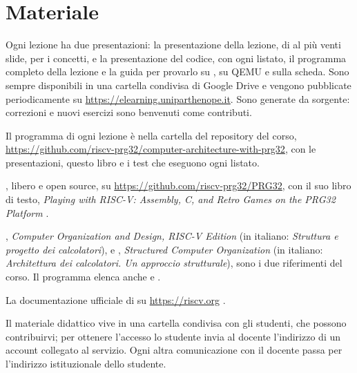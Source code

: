 \section{Materiale}

\begin{description}[style=nextline,leftmargin=1.5em]
\item[Slide.] Ogni lezione ha due presentazioni: la presentazione della
  lezione, di al più venti slide, per i concetti, e la presentazione del
  codice, con ogni listato, il programma completo della lezione e la guida per
  provarlo su \prgqt, su QEMU e sulla scheda. Sono sempre disponibili in una
  cartella condivisa di Google Drive e vengono pubblicate periodicamente su
  \url{https://elearning.uniparthenope.it}. Sono generate da sorgente:
  correzioni e nuovi esercizi sono benvenuti come contributi.
\item[Programmi.] Il programma di ogni lezione è nella cartella 
  del repository del corso,
  \url{https://github.com/riscv-prg32/computer-architecture-with-prg32}, con
  le presentazioni, questo libro e i test che eseguono ogni listato.
\item[Piattaforma.] \prg, libero e open source, su
  \url{https://github.com/riscv-prg32/PRG32}, con il suo libro di testo,
  \emph{Playing with RISC-V: Assembly, C, and Retro Games on the PRG32
  Platform} \citep{prg32textbook}.
\item[Libri di testo.] \citet{patterson2020}, \emph{Computer Organization and
  Design, RISC-V Edition} (in italiano: \emph{Struttura e progetto dei
  calcolatori}), e \citet{tanenbaum2013}, \emph{Structured Computer
  Organization} (in italiano: \emph{Architettura dei calcolatori. Un approccio
  strutturale}), sono i due riferimenti del corso. Il programma elenca anche
  \citet{stallings2021} e \citet{bucci2017}.
\item[Standard.] La documentazione ufficiale di \riscv su
  \url{https://riscv.org} \citep{riscvisa}.
\end{description}

Il materiale didattico vive in una cartella condivisa con gli studenti, che
possono contribuirvi; per ottenere l'accesso lo studente invia al docente
l'indirizzo di un account collegato al servizio. Ogni altra comunicazione con
il docente passa per l'indirizzo istituzionale dello studente.

